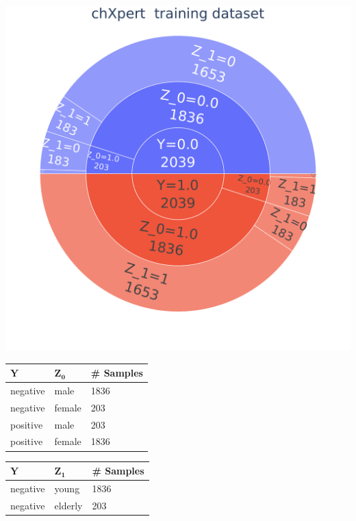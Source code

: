 \documentclass[12pt,DIV14,BCOR12mm,a4paper,footinclude=false,headinclude,parskip=half-,twoside,openright,cleardoublepage=empty,toc=index,bibliography=totoc,listof=totoc]{scrreprt}
\numberwithin{equation}{chapter}
\begin{document}
 \begin{table}[H]
    \begin{minipage}[H]{\linewidth}
        \centering
        \begin{minipage}[H]{0.5\linewidth}
            \centering
            \includegraphics[width=0.8\linewidth]{thesis/figures/data_distribution_chXpert__training_dataset_1.pdf}
        \end{minipage}%
        \hfill
        \begin{minipage}[H]{0.5\linewidth}
            \centering
            \small
            \begin{tabular}{|p{1.25cm}|p{1.75cm}|p{2cm}|}
                \hline
                $\mathbf{Y}$ & $\mathbf{Z_0}$ & \# \textbf{Samples } \\
                \hline
                negative & male & 1836 \\
                negative & female & 203\\
                positive & male & 203 \\
                positive & female & 1836\\
                \hline
            \end{tabular}
            \begin{tabular}{|p{1.25cm}|p{1.75cm}|p{2cm}|}
                \hline
                $\mathbf{Y}$ & $\mathbf{Z_1}$ & \# \textbf{Samples } \\
                \hline
                negative & young & 1836 \\
                negative & elderly & 203\\

\end{tabular}
\end{minipage}
\end{minipage}
\end{table}
\end{document}
